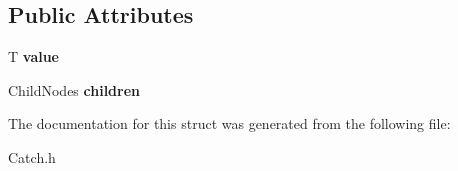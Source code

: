 \subsection*{Public Attributes}
\begin{DoxyCompactItemize}
\item 
\hypertarget{struct_catch_1_1_cumulative_reporter_base_1_1_node_ac028cad2accba6cac30b92619bc8cfa0}{T {\bfseries value}}\label{struct_catch_1_1_cumulative_reporter_base_1_1_node_ac028cad2accba6cac30b92619bc8cfa0}

\item 
\hypertarget{struct_catch_1_1_cumulative_reporter_base_1_1_node_a7b123f17f6b77f5cd4e2f9c1325515a4}{Child\-Nodes {\bfseries children}}\label{struct_catch_1_1_cumulative_reporter_base_1_1_node_a7b123f17f6b77f5cd4e2f9c1325515a4}

\end{DoxyCompactItemize}


The documentation for this struct was generated from the following file\-:\begin{DoxyCompactItemize}
\item 
Catch.\-h\end{DoxyCompactItemize}
